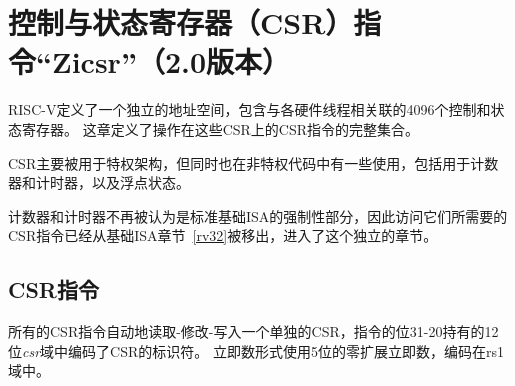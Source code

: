 
\chapter{控制与状态寄存器（CSR）指令“Zicsr”（2.0版本）}
\label{csrinsts}

RISC-V定义了一个独立的地址空间，包含与各硬件线程相关联的4096个控制和状态寄存器。
这章定义了操作在这些CSR上的CSR指令的完整集合。

\begin{commentary}
  CSR主要被用于特权架构，但同时也在非特权代码中有一些使用，包括用于计数器和计时器，以及浮点状态。

  计数器和计时器不再被认为是标准基础ISA的强制性部分，因此访问它们所需要的CSR指令已经从基础ISA章节~\ref{rv32}被移出，进入了这个独立的章节。
\end{commentary}

\section{CSR指令}

所有的CSR指令自动地读取-修改-写入一个单独的CSR，指令的位31-20持有的12位{\em csr}域中编码了CSR的标识符。
立即数形式使用5位的零扩展立即数，编码在rs1域中。

